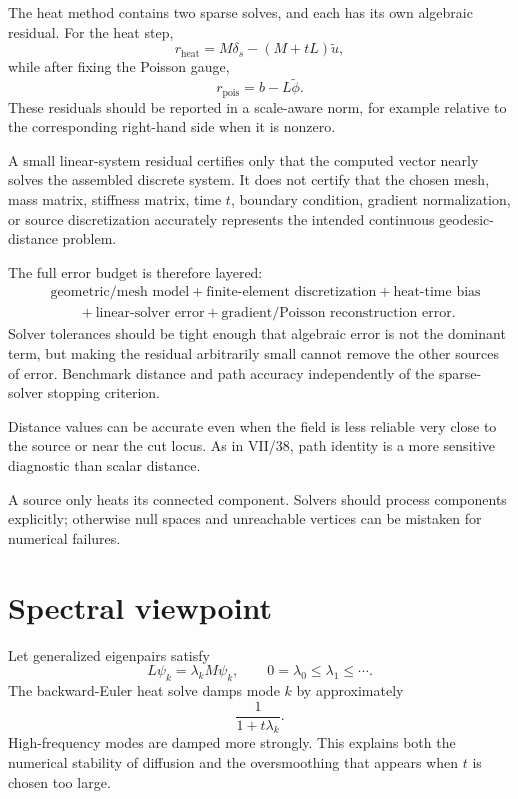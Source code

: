 \begin{remark}
The heat method contains two sparse solves, and each has its own algebraic
residual.  For the heat step,
\[
r_{\mathrm{heat}}
=
M\delta_s-(M+tL)\widetilde u,
\]
while after fixing the Poisson gauge,
\[
r_{\mathrm{pois}}
=
b-L\widetilde\phi.
\]
These residuals should be reported in a scale-aware norm, for example relative
to the corresponding right-hand side when it is nonzero.

A small linear-system residual certifies only that the computed vector nearly
solves the assembled discrete system.  It does not certify that the chosen
mesh, mass matrix, stiffness matrix, time \(t\), boundary condition, gradient
normalization, or source discretization accurately represents the intended
continuous geodesic-distance problem.

The full error budget is therefore layered:
\[
\begin{aligned}
&\text{geometric/mesh model}
+ \text{finite-element discretization}
+ \text{heat-time bias}\\
&\qquad
+ \text{linear-solver error}
+ \text{gradient/Poisson reconstruction error}.
\end{aligned}
\]
Solver tolerances should be tight enough that algebraic error is not the
dominant term, but making the residual arbitrarily small cannot remove the
other sources of error.  Benchmark distance and path accuracy independently of
the sparse-solver stopping criterion.
\end{remark}

Distance values can be accurate even when the field is less reliable very close
to the source or near the cut locus.  As in VII/38, path identity is a more
sensitive diagnostic than scalar distance.

\begin{warning}\label{warn:vii40-disconnected}
A source only heats its connected component.  Solvers should process components
explicitly; otherwise null spaces and unreachable vertices can be mistaken for
numerical failures.
\end{warning}

\section{Spectral viewpoint}

Let generalized eigenpairs satisfy
\[
L\psi_k=\lambda_k M\psi_k,
\qquad
0=\lambda_0\le\lambda_1\le\cdots.
\]
The backward-Euler heat solve damps mode \(k\) by approximately
\[
\frac{1}{1+t\lambda_k}.
\]
High-frequency modes are damped more strongly.  This explains both the numerical
stability of diffusion and the oversmoothing that appears when \(t\) is chosen
too large.

